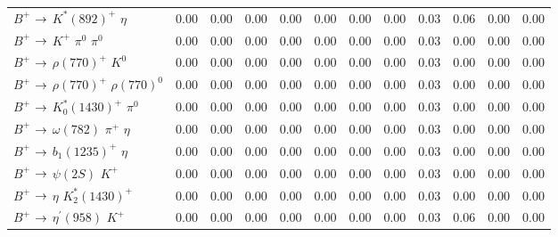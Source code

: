 {\begin{tabular}{lrrrrrrrrrrr}
$B^{+}$ $\rightarrow$ $K^{*}(892)^{+}$ $\eta$                                &         0.00 &         0.00 &         0.00 &         0.00 &         0.00 &         0.00 &         0.00 &         0.03 &         0.06 &         0.00 &         0.00 \\
$B^{+}$ $\rightarrow$ $K^{+}$ $\pi^{0}$ $\pi^{0}$                            &         0.00 &         0.00 &         0.00 &         0.00 &         0.00 &         0.00 &         0.00 &         0.03 &         0.00 &         0.00 &         0.00 \\
$B^{+}$ $\rightarrow$ $\rho(770)^{+}$ $K^{0}$                                &         0.00 &         0.00 &         0.00 &         0.00 &         0.00 &         0.00 &         0.00 &         0.03 &         0.00 &         0.00 &         0.00 \\
$B^{+}$ $\rightarrow$ $\rho(770)^{+}$ $\rho(770)^{0}$                        &         0.00 &         0.00 &         0.00 &         0.00 &         0.00 &         0.00 &         0.00 &         0.03 &         0.00 &         0.00 &         0.00 \\
$B^{+}$ $\rightarrow$ $K_{0}^{*}(1430)^{+}$ $\pi^{0}$                        &         0.00 &         0.00 &         0.00 &         0.00 &         0.00 &         0.00 &         0.00 &         0.03 &         0.00 &         0.00 &         0.00 \\
$B^{+}$ $\rightarrow$ $\omega(782)$ $\pi^{+}$ $\eta$                         &         0.00 &         0.00 &         0.00 &         0.00 &         0.00 &         0.00 &         0.00 &         0.03 &         0.00 &         0.00 &         0.00 \\
$B^{+}$ $\rightarrow$ $b_{1}(1235)^{+}$ $\eta$                               &         0.00 &         0.00 &         0.00 &         0.00 &         0.00 &         0.00 &         0.00 &         0.03 &         0.00 &         0.00 &         0.00 \\
$B^{+}$ $\rightarrow$ $\psi(2S)$ $K^{+}$                                     &         0.00 &         0.00 &         0.00 &         0.00 &         0.00 &         0.00 &         0.00 &         0.03 &         0.00 &         0.00 &         0.00 \\
$B^{+}$ $\rightarrow$ $\eta$ $K_{2}^{*}(1430)^{+}$                           &         0.00 &         0.00 &         0.00 &         0.00 &         0.00 &         0.00 &         0.00 &         0.03 &         0.00 &         0.00 &         0.00 \\
$B^{+}$ $\rightarrow$ $\eta^{\prime}(958)$ $K^{+}$                           &         0.00 &         0.00 &         0.00 &         0.00 &         0.00 &         0.00 &         0.00 &         0.03 &         0.06 &         0.00 &         0.00 \\

\end{tabular}}
